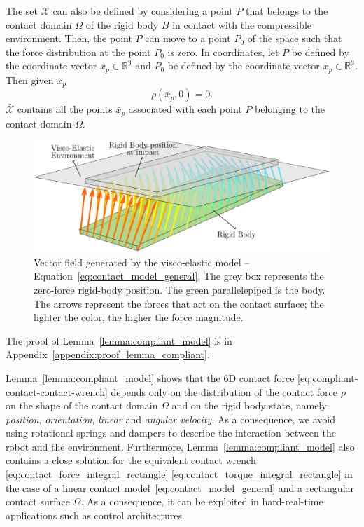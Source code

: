 The set $\bar{\mathcal{X}}$ can also be defined by considering a point $P$ that belongs to the contact domain $\Omega$ of the rigid body $B$ in contact with the compressible environment. Then, the point $P$ can move to a point $P_0$ of the space such that the force distribution at the point $P_0$ is zero. In coordinates, let $P$ be defined by the coordinate vector $x_p \in \mathbb{R}^3$ and $P_0$ be defined by the coordinate vector $\bar{x}_p \in \mathbb{R}^3$. Then given $x_p$
\begin{equation}
    \rho(\bar{x}_p, 0) = 0.
\end{equation}
$\bar{\mathcal{X}}$ contains all the points $\bar{x}_p$ associated with each point $P$ belonging to the contact domain $\Omega$.
\begin{figure}[t]
\centering
\includegraphics[width=1\columnwidth]{chapter_compliant_contact/figures/paper_fig.pdf}
\caption[Vector field generated by the visco-elastic model]{Vector field generated by the visco-elastic model -- Equation~\eqref{eq:contact_model_general}. The grey box represents the zero-force rigid-body position. The green parallelepiped is the body. The arrows represent the forces that act on the contact surface; the lighter the color, the higher the force magnitude. \label{fig:contact_model_vector_field}}
\end{figure}
The proof of Lemma~\ref{lemma:compliant_model} is in Appendix~\ref{appendix:proof_lemma_compliant}.
\par
Lemma~\ref{lemma:compliant_model} shows that the 6D contact force \eqref{eq:compliant-contact-contact-wrench} depends only on the distribution of the contact force $\rho$ on the shape of the contact domain $\Omega$ and on the rigid body state, namely \emph{position}, \emph{orientation}, \emph{linear} and \emph{angular velocity}. As a consequence, we avoid using rotational springs and dampers to describe the interaction between the robot and the environment. Furthermore, Lemma~\ref{lemma:compliant_model} also contains a close solution for the equivalent contact wrench \eqref{eq:contact_force_integral_rectangle} \eqref{eq:contact_torque_integral_rectangle} in the case of a linear contact model~\eqref{eq:contact_model_general} and a rectangular contact surface $\Omega$. As a consequence, it can be exploited in hard-real-time applications such as control architectures.
